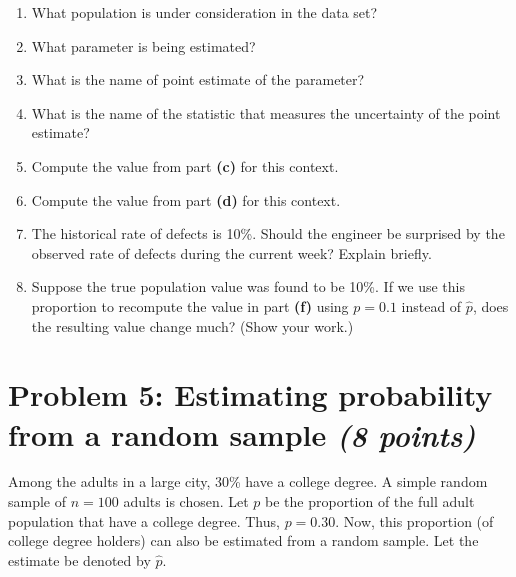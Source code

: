 \documentclass[11pt,twoside]{article}
\newcommand{\pts}[1]{\marginpar{ \small\hspace{0pt} \textit{[#1]} } }
\numberwithin{equation}{section}
\newcommand{\?}{\stackrel{?}{=}}
\begin{document}
\begin{enumerate}[\bf (a)]
\item What population is under consideration in the data set? \boxed{\huge\phantom{BB}}\pts{1}
\item What parameter is being estimated? \boxed{\huge\phantom{BB}} \pts{1}
\item What is the name of point estimate of the parameter? \boxed{\huge\phantom{BB}} \pts{1}
\item What is the name of the statistic that measures the uncertainty of the point estimate? \pts{1} \boxed{\huge\phantom{BB}} 

\item Compute the value from part \textbf{(c)} for this context. \pts{2}
\vspace{10ex}

\item Compute the value from part \textbf{(d)} for this context. \pts{2}
\vspace{10ex}

\item The historical rate of defects is 10\%. \pts{2} Should the engineer be surprised by the observed rate of defects during the current week? Explain briefly.
\vspace{12ex}

\item Suppose the true population value was found to be 10\%. \pts{2} If we use this proportion to recompute the value in part \textbf{(f)} using $p = 0.1$ instead of $\hat{p}$, does the resulting value change much? (Show your work.)

\end{enumerate}

\eject


\section*{Problem 5: Estimating probability from a random sample \textit{(8 points)}}
Among the adults in a large city, 30\% have a college degree. A simple random sample of $n=100$ adults is chosen.
Let $p$ be the proportion of the full adult population that have a college degree. Thus, $p = 0.30$. Now, this proportion
  (of college degree holders) can also be estimated from a random sample. Let the estimate be denoted by $\hat
  p$.
\end{document}
